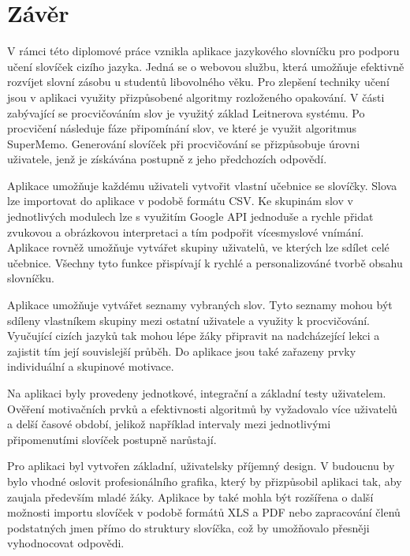 \documentclass[a4paper,11pt,titlepage,fleqn]{article}
\begin{document}
\newpage
\section{Závěr}
    V rámci této diplomové práce vznikla aplikace jazykového slovníčku pro podporu učení slovíček cizího jazyka. Jedná se o webovou službu, která umožňuje efektivně rozvíjet slovní zásobu u studentů libovolného věku. Pro zlepšení techniky učení jsou v aplikaci využity přizpůsobené algoritmy rozloženého opakování. V části zabývající se procvičováním slov je využitý základ Leitnerova systému. Po procvičení následuje fáze připomínání slov, ve které je využit algoritmus SuperMemo. Generování slovíček při procvičování se přizpůsobuje úrovni uživatele, jenž je získávána postupně z jeho předchozích odpovědí. 

    Aplikace umožňuje každému uživateli vytvořit vlastní učebnice se slovíčky. Slova lze importovat do aplikace v podobě formátu CSV. Ke skupinám slov v jednotlivých modulech lze s využitím Google API jednoduše a rychle přidat zvukovou a obrázkovou interpretaci a tím podpořit vícesmyslové vnímání. Aplikace rovněž umožňuje vytvářet skupiny uživatelů, ve kterých lze sdílet celé učebnice. Všechny tyto funkce přispívají k rychlé a personalizováné tvorbě obsahu slovníčku.

    Aplikace umožňuje vytvářet seznamy vybraných slov. Tyto seznamy mohou být sdíleny vlastníkem skupiny mezi ostatní uživatele a využity k procvičování. Vyučující cizích jazyků tak mohou lépe žáky připravit na nadcházející lekci a zajistit tím její souvislejší průběh. Do aplikace jsou také zařazeny prvky individuální a skupinové motivace. 

    Na aplikaci byly provedeny jednotkové, integrační a základní testy uživatelem. Ověření motivačních prvků a efektivnosti algoritmů by vyžadovalo více uživatelů a delší časové období, jelikož například intervaly mezi jednotlivými připomenutími slovíček postupně narůstají.

    Pro aplikaci byl vytvořen základní, uživatelsky příjemný design. V budoucnu by bylo vhodné oslovit profesionálního grafika, který by přizpůsobil aplikaci tak, aby zaujala především mladé žáky. Aplikace by také mohla být rozšířena o další možnosti importu slovíček v podobě formátů XLS a PDF nebo zapracování členů podstatných jmen přímo do struktury slovíčka, což by umožňovalo přesněji vyhodnocovat odpovědi.
\end{document}
